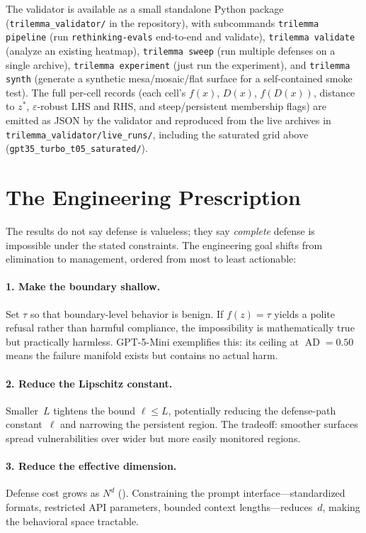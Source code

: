 \documentclass{article}
\newcommand{\AD}{\operatorname{AD}}
\begin{document}
The validator is available as a small standalone Python package
(\texttt{trilemma\_validator/} in the repository), with subcommands
\texttt{trilemma pipeline} (run \texttt{rethinking-evals} end-to-end
and validate), \texttt{trilemma validate} (analyze an existing
heatmap), \texttt{trilemma sweep} (run multiple defenses on a single
archive), \texttt{trilemma experiment} (just run the experiment),
and \texttt{trilemma synth} (generate a synthetic
mesa/mosaic/flat surface for a self-contained smoke test). The full
per-cell records (each cell's $f(x)$, $D(x)$, $f(D(x))$, distance
to $z^{*}$, $\varepsilon$-robust LHS and RHS, and steep/persistent
membership flags) are emitted as JSON by the validator and
reproduced from the live archives in
\texttt{trilemma\_validator/live\_runs/}, including the saturated
grid above (\texttt{gpt35\_turbo\_t05\_saturated/}).


\section{The Engineering Prescription}
\label{sec:engineering}

The results do not say defense is valueless; they say \emph{complete}
defense is impossible under the stated constraints. The engineering
goal shifts from elimination to management, ordered from most to least
actionable:

\paragraph{1. Make the boundary shallow.}
Set $\tau$ so that boundary-level behavior is benign. If $f(z) = \tau$
yields a polite refusal rather than harmful compliance, the
impossibility is mathematically true but practically harmless.
GPT-5-Mini exemplifies this: its ceiling at $\AD = 0.50$ means the
failure manifold exists but contains no actual harm.

\paragraph{2. Reduce the Lipschitz constant.}
Smaller~$L$ tightens the bound $\ell \leq L$, potentially reducing
the defense-path constant~$\ell$ and narrowing the persistent region.
The tradeoff: smoother surfaces spread vulnerabilities over wider but
more easily monitored regions.

\paragraph{3. Reduce the effective dimension.}
Defense cost grows as $N^d$ (). Constraining the prompt
interface---standardized formats, restricted API parameters, bounded
context lengths---reduces~$d$, making the behavioral space tractable.
\end{document}
